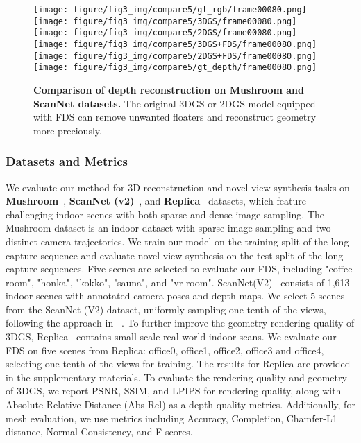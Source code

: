 \begin{figure}[t]
    \texttt{[image: figure/fig3\_img/compare5/gt\_rgb/frame00080.png]}
    \texttt{[image: figure/fig3\_img/compare5/3DGS/frame00080.png]}
    \texttt{[image: figure/fig3\_img/compare5/2DGS/frame00080.png]}
    \texttt{[image: figure/fig3\_img/compare5/3DGS+FDS/frame00080.png]}
    \texttt{[image: figure/fig3\_img/compare5/2DGS+FDS/frame00080.png]}
    \texttt{[image: figure/fig3\_img/compare5/gt\_depth/frame00080.png]} \\



    \caption{\textbf{Comparison of depth reconstruction on Mushroom and ScanNet datasets.} The original
    3DGS or 2DGS model equipped with FDS can remove unwanted floaters and reconstruct
    geometry more preciously.}
    \label{fig:compare}
\end{figure}


\subsubsection{Datasets and Metrics}

We evaluate our method for 3D reconstruction 
and novel view synthesis tasks on
\textbf{Mushroom}~\citep{ren2024mushroom},
\textbf{ScanNet (v2)}~\citep{dai2017scannet}, and 
\textbf{Replica}~\citep{replica19arxiv}
datasets,
which feature challenging indoor scenes with both 
sparse and dense image sampling.
%
The Mushroom dataset is an indoor dataset 
with sparse image sampling and two distinct 
camera trajectories. 
%
We train our model on the training split of 
the long capture sequence and evaluate 
novel view synthesis on the test split 
of the long capture sequences.
%
Five scenes are selected to evaluate our FDS, 
including "coffee room", "honka", "kokko", 
"sauna", and "vr room". 
%
ScanNet(V2)~\citep{dai2017scannet}  consists of 1,613 indoor scenes
with annotated camera poses and depth maps. 
%
We select 5 scenes from the ScanNet (V2) dataset, 
uniformly sampling one-tenth of the views,
following the approach in ~\citep{guo2022manhattan}.
To further improve the geometry rendering quality of 3DGS, 
%
Replica~\citep{replica19arxiv} contains small-scale 
real-world indoor scans. 
We evaluate our FDS on five scenes from 
Replica: office0, office1, office2, office3 and office4,
selecting one-tenth of the views for training.
%
The results for Replica are provided in the 
supplementary materials.
To evaluate the rendering quality and geometry 
of 3DGS, we report PSNR, SSIM, and LPIPS for 
rendering quality, along with Absolute Relative Distance 
(Abs Rel) as a depth quality metrics.
%
Additionally, for mesh evaluation, 
we use metrics including Accuracy, Completion, 
Chamfer-L1 distance, Normal Consistency, 
and F-scores.





